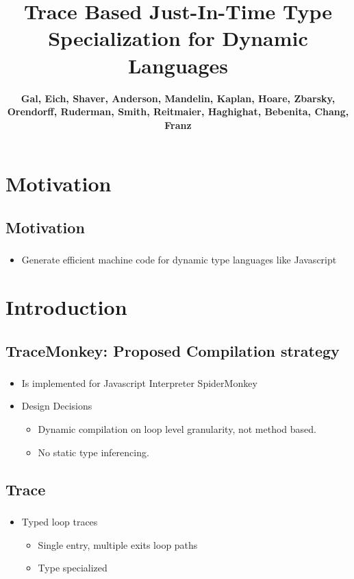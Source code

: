 \documentclass[mathserif,10pt]{beamer}
\title[Trace based JIT]{Trace Based Just-In-Time Type Specialization for Dynamic Languages}
\author[]{{\textbf{Gal, Eich, Shaver, Anderson, Mandelin, Kaplan, Hoare, Zbarsky, Orendorff, Ruderman, Smith, Reitmaier, Haghighat, Bebenita, Chang, Franz}} }
\begin{document}
  \begin{frame}
  \titlepage
  \end{frame}

\frame
{
}

\section{Motivation}
\subsection{Motivation}
\frame
{
  \frametitle{\subsecname}
  \begin{itemize}
  \item Generate efficient machine code for dynamic type languages like Javascript
  \end{itemize}
}

\section{Introduction}
\subsection{TraceMonkey: Proposed Compilation strategy}
\frame
{
  \frametitle{\subsecname}
  \begin{itemize}
    \item Is implemented for Javascript Interpreter SpiderMonkey
    \item{ Design Decisions}
      \begin{itemize}
        \item Dynamic compilation on loop level granularity, not method based. 
        \item No static type inferencing.
    \end{itemize}
  \end{itemize}
}
\subsection{Trace}
\frame
{
  \frametitle{\subsecname}
  \begin{itemize}
    \item Typed loop traces
    \begin{itemize}
      \item Single entry, multiple exits loop paths
      \item Type specialized
    \end{itemize}
  \end{itemize}
}
\end{document}
